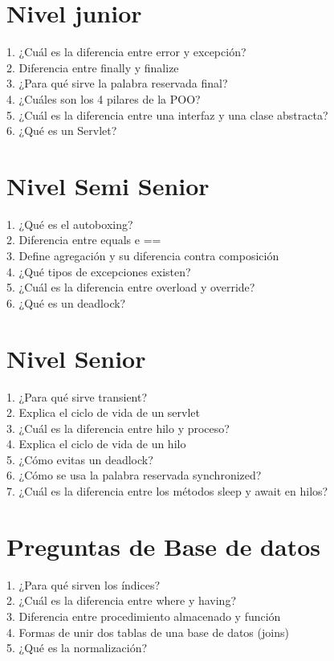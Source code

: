 \section{Nivel junior}
1.	¿Cuál es la diferencia entre error y excepción?\\
2.	Diferencia entre finally y finalize\\
3.	¿Para qué sirve la palabra reservada final?\\
4.	¿Cuáles son los 4 pilares de la POO?\\
5.	¿Cuál es la diferencia entre una interfaz y una clase abstracta?\\
6.	¿Qué es un Servlet?
\section{Nivel Semi Senior}
1.	¿Qué es el autoboxing?\\
2.	Diferencia entre equals e ==\\
3.	Define agregación y su diferencia contra composición\\
4.	¿Qué tipos de excepciones existen?\\
5.	¿Cuál es la diferencia entre overload y override?\\
6.	¿Qué es un deadlock?
\section{Nivel Senior}
1.	¿Para qué sirve transient?\\
2.	Explica el ciclo de vida de un servlet\\
3.	¿Cuál es la diferencia entre hilo y proceso?\\
4.	Explica el ciclo de vida de un hilo\\
5.	¿Cómo evitas un deadlock?\\
6.	¿Cómo se usa la palabra reservada synchronized?\\
7.	¿Cuál es la diferencia entre los métodos sleep y await en hilos?
\section{Preguntas de Base de datos}
1.	¿Para qué sirven los índices?\\
2.	¿Cuál es la diferencia entre where y having?\\
3.	Diferencia entre procedimiento almacenado y función\\
4.	Formas de unir dos tablas de una base de datos (joins)\\
5.	¿Qué es la normalización?
